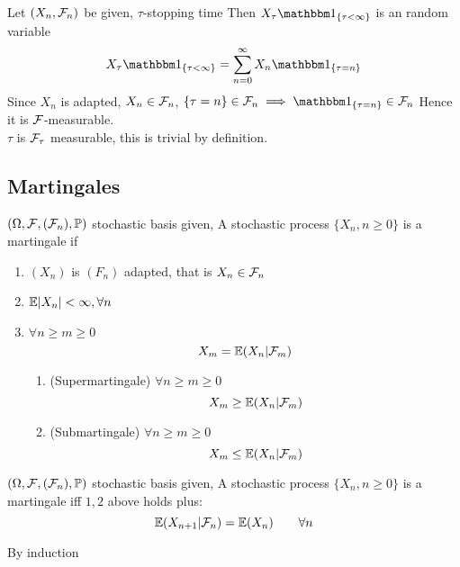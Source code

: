 \vfill
Let $(X_n, \mathcal{F}_n)$ be given, $\tau$-stopping time Then $X_\tau\I_{\{\tau < \infty\}}$ is an random variable \\
\pf 
\begin{equation*}
    X_\tau\I_{\{\tau < \infty\}} = \bigs{n=0}^\infty X_n \I_{\{\tau =n\}}
\end{equation*}Since $X_n$ is adapted, $X_n\in \mathcal{F}_n$, $\{\tau = n\} \in \F_n \implies \I_{\{\tau =n\}} \in \F_n$ Hence it is $\mathcal{F}$-measurable. \\
$\tau$ is $\mathcal{F}_\tau$ measurable, this is trivial by definition.

\newpage 
\subsection{Martingales}
\begin{dfn}[Martingale] $(\Omega, \mathcal{F}, (\mathcal{F}_n), \mathbb{P})$ stochastic basis given, A stochastic process $\{X_n, n\geq 0\}$ is a martingale if 
\begin{enumerate}
    \item $(X_n)$ is $(F_n)$ adapted, that is $X_n\in\mathcal{F}_n$
    \item $\mathbb{E}|X_n| < \infty, \forall n$
    \item $\forall n\geq m\geq 0$
    \begin{equation*}
        X_m = \mathbb{E}(X_n| \mathcal{F}_m)
    \end{equation*}
    \begin{enumerate}
        \item (Supermartingale) $\forall n\geq m\geq 0$
        \begin{equation*}
        X_m \geq \mathbb{E}(X_n| \mathcal{F}_m)
    \end{equation*}
    \item (Submartingale) $\forall n\geq m\geq 0$
        \begin{equation*}
        X_m \leq \mathbb{E}(X_n| \mathcal{F}_m)
    \end{equation*}
    \end{enumerate}
\end{enumerate}
\end{dfn}
\begin{lem}
$(\Omega, \mathcal{F}, (\mathcal{F}_n), \mathbb{P})$ stochastic basis given, A stochastic process $\{X_n, n\geq 0\}$ is a martingale iff $1, 2$ above holds plus: 
\begin{equation*}
    \mathbb{E}(X_{n+1}|\mathcal{F}_n) = \mathbb{E}(X_n) \qquad \forall n
\end{equation*}
\end{lem}
\pf By induction